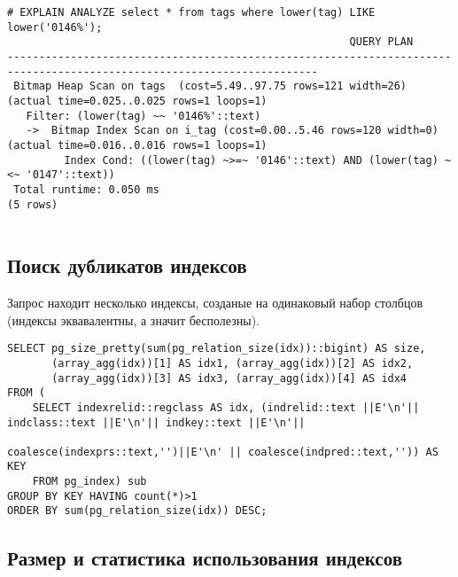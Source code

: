 \begin{lstlisting}[label=lst:snippets14,title=snippets/speed\_like.sql]
# EXPLAIN ANALYZE select * from tags where lower(tag) LIKE lower('0146%');
                                                      QUERY PLAN                                                       
-----------------------------------------------------------------------------------------------------------------------
 Bitmap Heap Scan on tags  (cost=5.49..97.75 rows=121 width=26) (actual time=0.025..0.025 rows=1 loops=1)
   Filter: (lower(tag) ~~ '0146%'::text)
   ->  Bitmap Index Scan on i_tag (cost=0.00..5.46 rows=120 width=0) (actual time=0.016..0.016 rows=1 loops=1)
         Index Cond: ((lower(tag) ~>=~ '0146'::text) AND (lower(tag) ~<~ '0147'::text))
 Total runtime: 0.050 ms
(5 rows)


\end{lstlisting}

\subsection{Поиск дубликатов индексов}
Запрос находит несколько индексы, созданые на одинаковый набор столбцов (индексы эквавалентны, а значит бесполезны).

\begin{lstlisting}[label=lst:snippets15,title=snippets/duplicate\_indexes.sql]
SELECT pg_size_pretty(sum(pg_relation_size(idx))::bigint) AS size,
       (array_agg(idx))[1] AS idx1, (array_agg(idx))[2] AS idx2,
       (array_agg(idx))[3] AS idx3, (array_agg(idx))[4] AS idx4
FROM (
    SELECT indexrelid::regclass AS idx, (indrelid::text ||E'\n'|| indclass::text ||E'\n'|| indkey::text ||E'\n'||
                                         coalesce(indexprs::text,'')||E'\n' || coalesce(indpred::text,'')) AS KEY
    FROM pg_index) sub
GROUP BY KEY HAVING count(*)>1
ORDER BY sum(pg_relation_size(idx)) DESC;
\end{lstlisting}

\subsection{Размер и статистика использования индексов}


